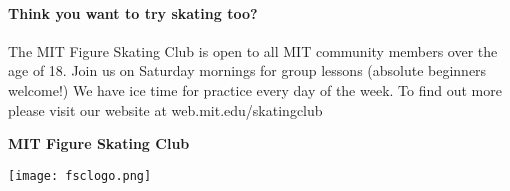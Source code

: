 \documentclass[12pt]{article}
\begin{document}
\begin{multicols*}{2}


\paragraph{Think you want to try skating too?} The MIT Figure Skating Club is open to all MIT community members over the age of 18. Join us on Saturday mornings for group lessons (absolute beginners welcome!) We have ice time for practice every day of the week. To find out more please visit our website at web.mit.edu/skatingclub

\vfill\null
\columnbreak


\begin{center}

\vspace*{1.5in}

\begin{Large}
{\bfseries
MIT Figure Skating Club
}
\end{Large}

\vspace{0.2in}

\begin{large}
{\bfseries
}
\end{large}

\vspace{0.7in}

\texttt{[image: fsclogo.png]}

\end{center}

\vfill\null
\columnbreak



\begin{center}


\end{center}
\end{multicols*}
\end{document}
